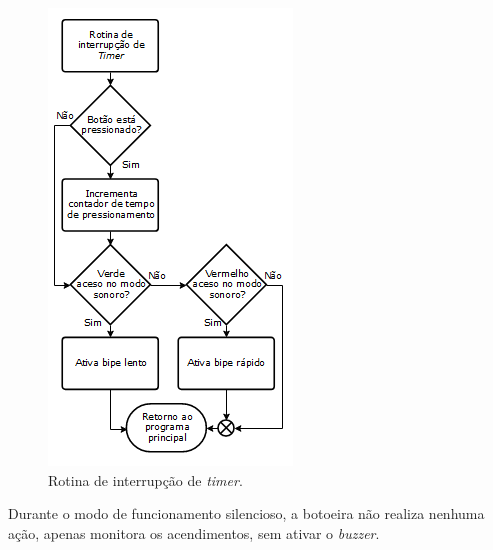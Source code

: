 \begin{figure}[ht]
    \begin{center}
    \includegraphics{figuras/rotina_timer.PNG}
    \end{center}
    \caption[Timer da botoeira]{Rotina de interrupção de \textit{timer}.}
    \label{timer}
\end{figure}

Durante o modo de funcionamento silencioso, a botoeira não realiza nenhuma ação, apenas monitora os acendimentos, sem ativar o \textit{buzzer}.

